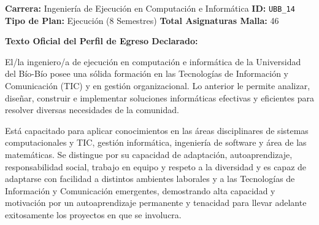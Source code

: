 \documentclass[11pt,a4paper]{article}
\begin{document}
\begin{tcolorbox}[fichaStyle, title={UNIVERSIDAD 14: Universidad del Bío-Bío (UBB)}]
\small\sffamily
\textbf{Carrera:} Ingeniería de Ejecución en Computación e Informática \hfill \textbf{ID:} \texttt{UBB\_14} \\
\textbf{Tipo de Plan:} Ejecución (8 Semestres) \hfill \textbf{Total Asignaturas Malla:} 46

\tcbline

\textbf{Texto Oficial del Perfil de Egreso Declarado:}\\[4pt]
{\small\rmfamily
El/la ingeniero/a de ejecución en computación e informática de la Universidad del Bío-Bío posee una sólida formación en las Tecnologías de Información y Comunicación (TIC) y en gestión organizacional. Lo anterior le permite analizar, diseñar, construir e implementar soluciones informáticas efectivas y eficientes para resolver diversas necesidades de la comunidad.

\vspace{4pt}
Está capacitado para aplicar conocimientos en las áreas disciplinares de sistemas computacionales y TIC, gestión informática, ingeniería de software y área de las matemáticas. Se distingue por su capacidad de adaptación, autoaprendizaje, responsabilidad social, trabajo en equipo y respeto a la diversidad y es capaz de adaptarse con facilidad a distintos ambientes laborales y a las Tecnologías de Información y Comunicación emergentes, demostrando alta capacidad y motivación por un autoaprendizaje permanente y tenacidad para llevar adelante exitosamente los proyectos en que se involucra.
}
\end{tcolorbox}

\vspace{10pt}
\end{document}
